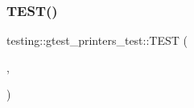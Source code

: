 \mbox{\label{namespacetesting_1_1gtest__printers__test_a2121c7c548cc174639947ff8f810759a}} 
\subsubsection{\texorpdfstring{TEST()}{TEST()}\hspace{0.1cm}{\footnotesize\ttfamily [117/117]}}
{\footnotesize\ttfamily testing\+::gtest\+\_\+printers\+\_\+test\+::\+T\+E\+ST (\begin{DoxyParamCaption}\item[{Universal\+Terse\+Print\+Tuple\+Fields\+To\+Strings\+Test\+With\+Std}]{,  }\item[{Prints\+Tersely}]{ }\end{DoxyParamCaption})}

